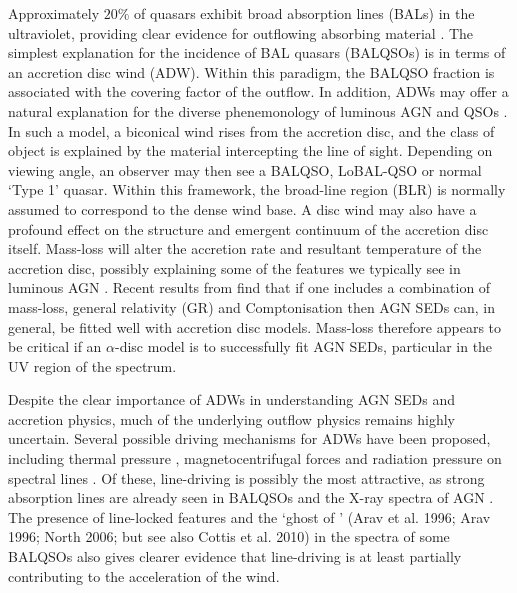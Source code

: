 \documentclass[useAMS,usenatbib]{mn2e_x}
\begin{document}
Approximately $20\%$ of quasars exhibit broad absorption lines (BALs) in the ultraviolet,
providing clear evidence for outflowing absorbing material
\citep{weymann1991, reichard2003, knigge2008, turnermiller2009, allen2011}.
The simplest explanation for the incidence of 
BAL quasars (BALQSOs) is in terms of an accretion disc wind (ADW). 
Within this paradigm, the BALQSO fraction is associated with
the covering factor of the outflow.
In addition, ADWs may offer a natural explanation for the
diverse phenemonology of luminous AGN and QSOs \citep[e.g.][]{MCGV95, elvis2000}. 
In such a model, a biconical wind rises from 
the accretion disc, and the class of object is explained by the material
intercepting the line of sight. Depending on viewing angle, an observer 
may then see a BALQSO, LoBAL-QSO or normal `Type 1' quasar.
Within this framework, the broad-line region (BLR) is normally
assumed to correspond to the dense wind base.
A disc wind may also have a profound effect on the structure and 
emergent continuum of the accretion disc itself.
Mass-loss will alter the accretion rate and resultant 
temperature of the accretion disc, possibly explaining some 
of the features we typically see in luminous AGN \citep{laordavis2014}.
Recent results from \cite{capellupo2015} find 
that if one includes a combination of mass-loss, general relativity (GR) and Comptonisation
then AGN SEDs can, in general, be fitted well with accretion disc models.
Mass-loss therefore appears to be critical if an $\alpha$-disc
model is to successfully fit AGN SEDs, particular in the UV region of the spectrum.

Despite the clear importance of ADWs in understanding AGN SEDs and accretion physics, 
much of the underlying outflow physics remains highly uncertain. 
Several possible driving mechanisms for ADWs have been proposed, including
thermal pressure \citep{weymann1982, begelman1991}, magnetocentrifugal forces 
\citep{blandfordpayne,pelletier_pudritz} and 
radiation pressure on spectral lines \citep[`line-driving';][]{lucysolomon1970,shlosman1985,MCGV95}.
Of these, line-driving is possibly the most attractive, as
strong absorption lines are already seen in BALQSOs and the X-ray spectra of AGN 
\citep{reeves2003,poundsreeves2009,tombesi2010a}.
The presence of line-locked features \citep{bowler2014} 
and the `ghost of \la' (Arav et al. 1996; Arav 1996; North 2006; but see 
also Cottis et al. 2010) \nocite{arav1995, arav1996, north2006,cottis2010}
in the spectra of some BALQSOs also gives clearer evidence that line-driving is
at least partially contributing to the acceleration of the wind.
\end{document}
